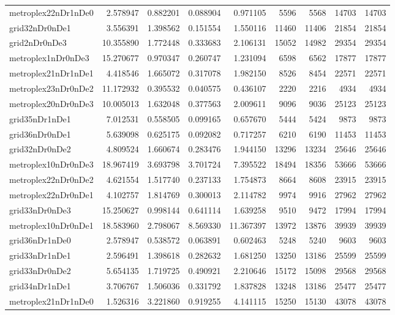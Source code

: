 \begin{longtable}{|l|r|r|r|r|r|r|r|r|}
metroplex22nDr1nDe0 & 2.578947 & 0.882201 & 0.088904 & 0.971105 & 5596 & 5568 & 14703 & 14703 \\
grid32nDr0nDe1 & 3.556391 & 1.398562 & 0.151554 & 1.550116 & 11460 & 11406 & 21854 & 21854 \\
grid2nDr0nDe3 & 10.355890 & 1.772448 & 0.333683 & 2.106131 & 15052 & 14982 & 29354 & 29354 \\
metroplex1nDr0nDe3 & 15.270677 & 0.970347 & 0.260747 & 1.231094 & 6598 & 6562 & 17877 & 17877 \\
metroplex21nDr1nDe1 & 4.418546 & 1.665072 & 0.317078 & 1.982150 & 8526 & 8454 & 22571 & 22571 \\
metroplex23nDr0nDe2 & 11.172932 & 0.395532 & 0.040575 & 0.436107 & 2220 & 2216 & 4934 & 4934 \\
metroplex20nDr0nDe3 & 10.005013 & 1.632048 & 0.377563 & 2.009611 & 9096 & 9036 & 25123 & 25123 \\
grid35nDr1nDe1 & 7.012531 & 0.558505 & 0.099165 & 0.657670 & 5444 & 5424 & 9873 & 9873 \\
grid36nDr0nDe1 & 5.639098 & 0.625175 & 0.092082 & 0.717257 & 6210 & 6190 & 11453 & 11453 \\
grid32nDr0nDe2 & 4.809524 & 1.660674 & 0.283476 & 1.944150 & 13296 & 13234 & 25646 & 25646 \\
metroplex10nDr0nDe3 & 18.967419 & 3.693798 & 3.701724 & 7.395522 & 18494 & 18356 & 53666 & 53666 \\
metroplex22nDr0nDe2 & 4.621554 & 1.517740 & 0.237133 & 1.754873 & 8664 & 8608 & 23915 & 23915 \\
metroplex22nDr0nDe1 & 4.102757 & 1.814769 & 0.300013 & 2.114782 & 9974 & 9916 & 27962 & 27962 \\
grid33nDr0nDe3 & 15.250627 & 0.998144 & 0.641114 & 1.639258 & 9510 & 9472 & 17994 & 17994 \\
metroplex10nDr0nDe1 & 18.583960 & 2.798067 & 8.569330 & 11.367397 & 13972 & 13876 & 39939 & 39939 \\
grid36nDr1nDe0 & 2.578947 & 0.538572 & 0.063891 & 0.602463 & 5248 & 5240 & 9603 & 9603 \\
grid33nDr1nDe1 & 2.596491 & 1.398618 & 0.282632 & 1.681250 & 13250 & 13186 & 25599 & 25599 \\
grid33nDr0nDe2 & 5.654135 & 1.719725 & 0.490921 & 2.210646 & 15172 & 15098 & 29568 & 29568 \\
grid34nDr1nDe1 & 3.706767 & 1.506036 & 0.331792 & 1.837828 & 13248 & 13186 & 25477 & 25477 \\
metroplex21nDr1nDe0 & 1.526316 & 3.221860 & 0.919255 & 4.141115 & 15250 & 15130 & 43078 & 43078 \\

\end{longtable}

